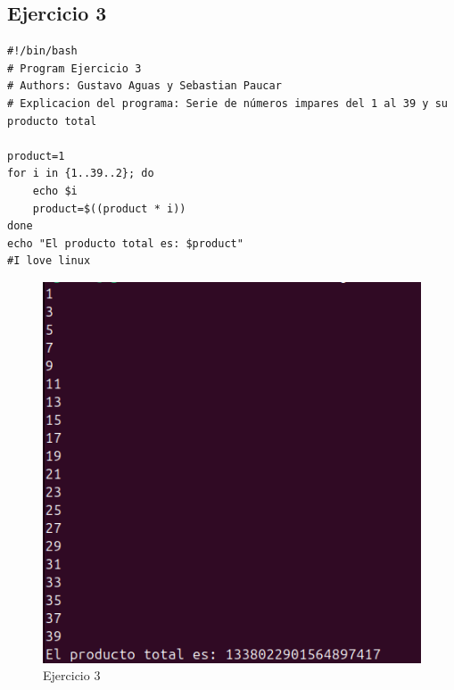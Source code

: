 \documentclass[11pt,twoside]{book}
\begin{document}
\subsection{Ejercicio 3}
\begin{lstlisting}
#!/bin/bash
# Program Ejercicio 3
# Authors: Gustavo Aguas y Sebastian Paucar
# Explicacion del programa: Serie de números impares del 1 al 39 y su producto total

product=1
for i in {1..39..2}; do
    echo $i
    product=$((product * i))
done
echo "El producto total es: $product"
#I love linux
\end{lstlisting}
\begin{figure}[h]
    \centering
    \includegraphics[width=0.75\linewidth]{series/ej3.png}
    \caption{Ejercicio 3}
\end{figure}
\newpage
\end{document}
